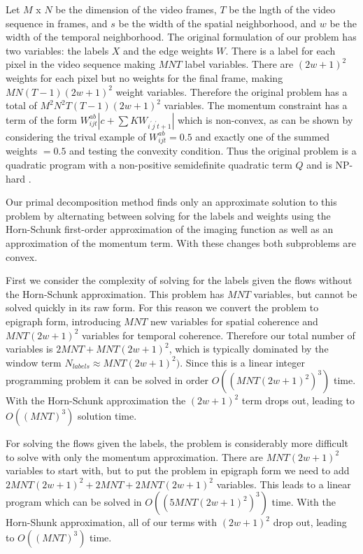 Let $M$ x $N$ be the dimension of the video frames, $T$ be the lngth of the video sequence in frames, and $s$ be the width of the spatial neighborhood, and $w$ be the width of the temporal neighborhood. The original formulation of our problem has two variables: the labels $X$ and the edge weights $W$. There is a label for each pixel in the video sequence making $M N T$ label variables. There are $(2 w+1)^2$ weights for each pixel but no weights for the final frame, making $M N (T-1) (2 w + 1)^2$ weight variables. Therefore the original problem has a total of $M^2 N^2 T (T-1) (2 w + 1)^2$ variables. The momentum constraint has a term of the form $W_{ijt}^{ab} |c + \sum K W_{i^{'} j^{'} t+1} |$ which is non-convex, as can be shown by considering the trival example of $W_{ijt}^{ab} = 0.5$ and exactly one of the summed weights $= 0.5$ and testing the convexity condition. Thus the original problem is a quadratic program with a non-positive semidefinite quadratic term $Q$ and is NP-hard \cite{sahni1974computationally}.

Our primal decomposition method finds only an approximate solution to this problem by alternating between solving for the labels and weights using the Horn-Schunk first-order approximation of the imaging function as well as an approximation of the momentum term. With these changes both subproblems are convex.

First we consider the complexity of solving for the labels given the flows without the Horn-Schunk approximation. This problem has $M N T$ variables, but cannot be solved quickly in its raw form. For this reason we convert the problem to epigraph form, introducing $M N T$ new variables for spatial coherence and $M N T (2 w + 1)^2$ variables for temporal coherence. Therefore our total number of variables is $2 M N T + M N T (2 w + 1)^2$, which is typically dominated by the window term $N_{labels} \approx M N T (2 w + 1)^2)$. Since this is a linear integer programming problem it can be solved in order $O((M N T (2 w + 1)^2)^3)$ time. With the Horn-Schunk approximation the $(2 w + 1)^2$ term drops out, leading to $O((M N T)^3)$ solution time.

For solving the flows given the labels, the problem is considerably more difficult to solve with only the momentum approximation. There are $M N T (2 w + 1)^2$ variables to start with, but to put the problem in epigraph form we need to add $2 M N T (2 w + 1)^2 + 2 M N T + 2 M N T (2 w + 1)^2$ variables. This leads to a linear program which can be solved in 
$O((5 M N T (2 w + 1)^2)^3)$ time. With the Horn-Shunk approximation, all of our terms with $(2 w + 1)^2$ drop out, leading to $O((M N T)^3)$ time.

